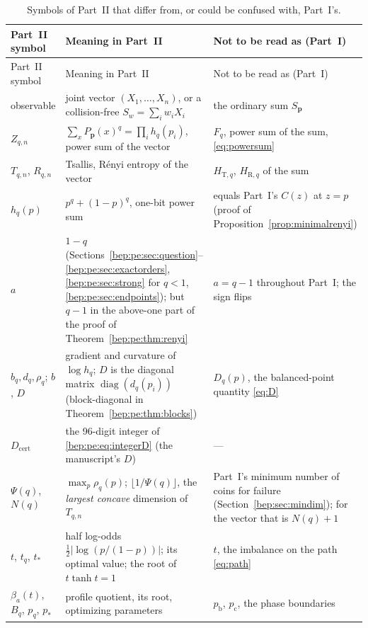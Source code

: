 \documentclass[11pt]{article}
\numberwithin{equation}{section}
\theoremstyle{definition}
\theoremstyle{remark}
\newcommand{\pb}{p_{\mathrm b}}
\newcommand{\pc}{p_{\mathrm c}}
\newcommand{\diag}{\operatorname{diag}}
\newcommand{\p}{\boldsymbol p}
\begin{document}
\begingroup\small
\setlength{\tabcolsep}{4pt}
\begin{longtable}{@{}>{\raggedright\arraybackslash}p{}
 >{\raggedright\arraybackslash}p{}
 >{\raggedright\arraybackslash}p{}@{}}
\caption{Symbols of Part~II that differ from, or could be confused with,
Part~I's.}\label{bep:pe:tab:notation}\\
\toprule
Part~II symbol & Meaning in Part~II & Not to be read as (Part~I)\\
\midrule\endfirsthead
\toprule
Part~II symbol & Meaning in Part~II & Not to be read as (Part~I)\\
\midrule\endhead
observable & joint vector $(X_1,\ldots,X_n)$, or a collision-free
 $S_w=\sum_iw_iX_i$ & the ordinary sum $S_{\boldsymbol p}$\\
$Z_{q,n}$ & $\sum_xP_{\p}(x)^q=\prod_ih_q(p_i)$, power sum of the vector &
 $F_q$, power sum of the sum, \eqref{eq:powersum}\\
$T_{q,n}$, $R_{q,n}$ & Tsallis, R\'enyi entropy of the vector &
 $H_{\mathrm T,q}$, $H_{\mathrm R,q}$ of the sum\\
$h_q(p)$ & $p^q+(1-p)^q$, one-bit power sum & equals Part~I's
 $C(z)$ at $z=p$ (proof of Proposition~\ref{prop:minimalrenyi})\\
$a$ & $1-q$ (Sections~\ref{bep:pe:sec:question}--\ref{bep:pe:sec:exactorders},
 \ref{bep:pe:sec:strong} for $q<1$, \ref{bep:pe:sec:endpoints}); but $q-1$
 in the above-one part of the proof of Theorem~\ref{bep:pe:thm:renyi} &
 $a=q-1$ throughout Part~I; the sign flips\\
$b_q,d_q,\rho_q$; $b$, $D$ & gradient and curvature of $\log h_q$; $D$ is the
 diagonal matrix $\diag(d_q(p_i))$ (block-diagonal in
 Theorem~\ref{bep:pe:thm:blocks}) & $D_q(p)$, the balanced-point
 quantity \eqref{eq:D}\\
$D_{\mathrm{cert}}$ & the 96-digit integer of
 \eqref{bep:pe:eq:integerD} (the manuscript's $D$) & --- \\
$\Psi(q)$, $N(q)$ & $\max_p\rho_q(p)$; $\lfloor1/\Psi(q)\rfloor$, the
 \emph{largest concave} dimension of $T_{q,n}$ & Part~I's minimum number
 of coins for failure (Section~\ref{bep:sec:mindim}); for the vector that
 is $N(q)+1$\\
$t$, $t_q$, $t_*$ & half log-odds $\tfrac12|\log(p/(1-p))|$; its optimal
 value; the root of $t\tanh t=1$ & $t$, the imbalance on the path
 \eqref{eq:path}\\
$\beta_a(t)$, $B_q$, $p_q$, $p_*$ & profile quotient, its root, optimizing
 parameters & $\pb$, $\pc$, the phase boundaries\\

\end{longtable}
\end{document}
